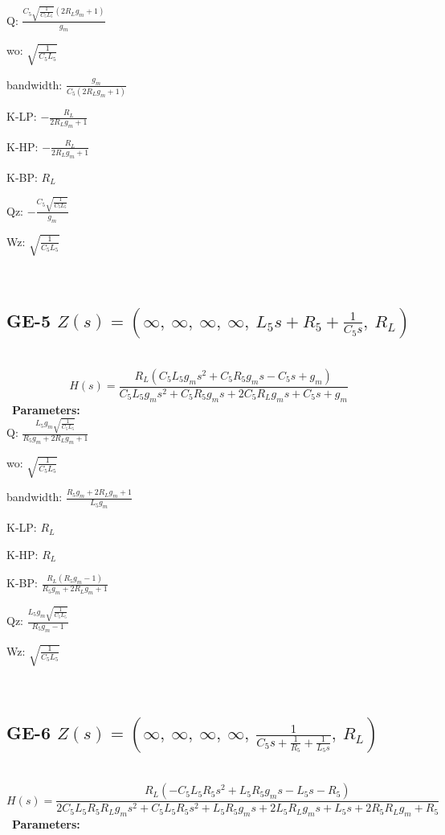 \documentclass{article}
\begin{document}
Q: $\frac{C_{5} \sqrt{\frac{1}{C_{5} L_{5}}} \left(2 R_{L} g_{m} + 1\right)}{g_{m}}$\ 

wo: $\sqrt{\frac{1}{C_{5} L_{5}}}$\ 

bandwidth: $\frac{g_{m}}{C_{5} \left(2 R_{L} g_{m} + 1\right)}$\ 

K-LP: $- \frac{R_{L}}{2 R_{L} g_{m} + 1}$\ 

K-HP: $- \frac{R_{L}}{2 R_{L} g_{m} + 1}$\ 

K-BP: $R_{L}$\ 

Qz: $- \frac{C_{5} \sqrt{\frac{1}{C_{5} L_{5}}}}{g_{m}}$\ 

Wz: $\sqrt{\frac{1}{C_{5} L_{5}}}$\ 

\ 

\subsection{GE-5 $Z(s) = \left( \infty, \  \infty, \  \infty, \  \infty, \  L_{5} s + R_{5} + \frac{1}{C_{5} s}, \  R_{L}\right)$ } \ 
\textbf{\[H(s) = \frac{R_{L} \left(C_{5} L_{5} g_{m} s^{2} + C_{5} R_{5} g_{m} s - C_{5} s + g_{m}\right)}{C_{5} L_{5} g_{m} s^{2} + C_{5} R_{5} g_{m} s + 2 C_{5} R_{L} g_{m} s + C_{5} s + g_{m}}\] } \ 
\textbf{Parameters:}\\ 

Q: $\frac{L_{5} g_{m} \sqrt{\frac{1}{C_{5} L_{5}}}}{R_{5} g_{m} + 2 R_{L} g_{m} + 1}$\ 

wo: $\sqrt{\frac{1}{C_{5} L_{5}}}$\ 

bandwidth: $\frac{R_{5} g_{m} + 2 R_{L} g_{m} + 1}{L_{5} g_{m}}$\ 

K-LP: $R_{L}$\ 

K-HP: $R_{L}$\ 

K-BP: $\frac{R_{L} \left(R_{5} g_{m} - 1\right)}{R_{5} g_{m} + 2 R_{L} g_{m} + 1}$\ 

Qz: $\frac{L_{5} g_{m} \sqrt{\frac{1}{C_{5} L_{5}}}}{R_{5} g_{m} - 1}$\ 

Wz: $\sqrt{\frac{1}{C_{5} L_{5}}}$\ 

\ 

\subsection{GE-6 $Z(s) = \left( \infty, \  \infty, \  \infty, \  \infty, \  \frac{1}{C_{5} s + \frac{1}{R_{5}} + \frac{1}{L_{5} s}}, \  R_{L}\right)$ } \ 
\textbf{\[H(s) = \frac{R_{L} \left(- C_{5} L_{5} R_{5} s^{2} + L_{5} R_{5} g_{m} s - L_{5} s - R_{5}\right)}{2 C_{5} L_{5} R_{5} R_{L} g_{m} s^{2} + C_{5} L_{5} R_{5} s^{2} + L_{5} R_{5} g_{m} s + 2 L_{5} R_{L} g_{m} s + L_{5} s + 2 R_{5} R_{L} g_{m} + R_{5}}\] } \ 
\textbf{Parameters:}\\ 
\end{document}
